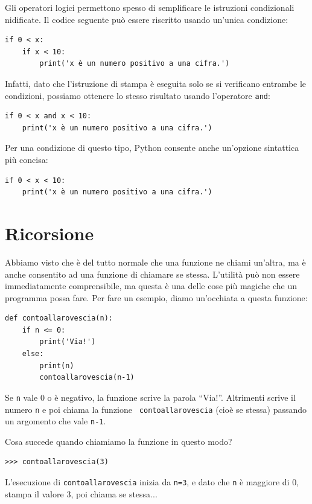 \documentclass[10pt]{book}
\begin{document}
Gli operatori logici permettono spesso di semplificare le istruzioni condizionali nidificate. Il codice seguente può essere riscritto usando un'unica condizione:

\begin{verbatim}
if 0 < x:
    if x < 10:
        print('x è un numero positivo a una cifra.')
\end{verbatim}
%
Infatti, dato che l'istruzione di stampa è eseguita solo se si verificano entrambe le condizioni, possiamo ottenere lo stesso risultato usando l'operatore {\tt and}:

\begin{verbatim}
if 0 < x and x < 10:
    print('x è un numero positivo a una cifra.')
\end{verbatim}

Per una condizione di questo tipo, Python consente anche un'opzione sintattica più concisa:

\begin{verbatim}
if 0 < x < 10:
    print('x è un numero positivo a una cifra.')
\end{verbatim}


\section{Ricorsione}
\label{recursion}

Abbiamo visto che è del tutto normale che una funzione ne chiami un'altra, ma è anche consentito ad una funzione di chiamare se stessa. L'utilità può non essere immediatamente comprensibile, ma questa è una delle cose più magiche che un programma possa fare. Per fare un esempio, diamo un'occhiata a questa funzione:

\begin{verbatim}
def contoallarovescia(n):
    if n <= 0:
        print('Via!')
    else:
        print(n)
        contoallarovescia(n-1)
\end{verbatim}
%
Se {\tt n} vale 0 o è negativo, la funzione scrive la parola ``Via!''.
Altrimenti scrive il numero {\tt n} e poi chiama la funzione {\tt
contoallarovescia} (cioè se stessa) passando un argomento che vale {\tt n-1}.

Cosa succede quando chiamiamo la funzione in questo modo?

\begin{verbatim}
>>> contoallarovescia(3)
\end{verbatim}
%
L'esecuzione di {\tt contoallarovescia} inizia da {\tt n=3}, e dato che
{\tt n} è maggiore di 0, stampa il valore 3, poi chiama se stessa...
\end{document}
